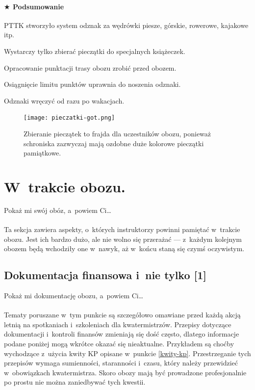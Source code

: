 \documentclass[a5paper,10pt,titlepage,twoside]{article}
\newcommand*{\thecheckbox}{\hss$\Box$} %
\newenvironment*{checklist}
{\list{}{%
\renewcommand*{\makelabel}[1]{\thecheckbox}}}
{\endlist}
\begin{document}
\paragraph{$\bigstar$ Podsumowanie}
\begin{checklist}
\item PTTK stworzyło system odznak za wędrówki piesze, górskie, rowerowe, kajakowe itp.
\item Wystarczy tylko zbierać pieczątki do specjalnych książeczek.
\item Opracowanie punktacji trasy obozu zrobić przed obozem.
\item Osiągnięcie limitu punktów uprawnia do noszenia odznaki.
\item Odznaki wręczyć od razu po wakacjach.
\end{checklist}

\begin{figure}[htp]
\centering
\texttt{[image: pieczatki-got.png]}
\caption{Zbieranie pieczątek to frajda dla uczestników obozu, ponieważ schroniska zazwyczaj mają ozdobne duże kolorowe pieczątki pamiątkowe.}
\label{fig:pieczątki}
\end{figure}

\cleardoublepage
\section{W~trakcie obozu.}
Pokaż mi swój obóz, a~powiem Ci\ldots\\
\\
Ta sekcja zawiera aspekty, o~których instruktorzy powinni pamiętać w~trakcie obozu. Jest ich bardzo dużo, ale nie wolno się przerażać --- z~każdym kolejnym obozem będą wchodziły one w~nawyk, aż w~końcu staną się czymś oczywistym.
\subsection{Dokumentacja finansowa i~nie tylko [1]}
Pokaż mi dokumentację obozu, a~powiem Ci\ldots\\
\\
Tematy poruszane w~tym punkcie są szczegółowo omawiane przed każdą akcją letnią na spotkaniach i~szkoleniach dla kwatermistrzów. Przepisy dotyczące dokumentacji i~kontroli finansów zmieniają się dość często, dlatego informacje podane poniżej mogą wkrótce okazać się nieaktualne. Przykładem są choćby wychodzące z~użycia kwity KP opisane w~punkcie \ref{kwity-kp}. Przestrzeganie tych przepisów wymaga sumienności, staranności i~czasu, który należy przewidzieć w~obowiązkach kwatermistrza. Skoro obozy mają być prowadzone profesjonalnie po prostu nie można zaniedbywać tych kwestii.
\end{document}

